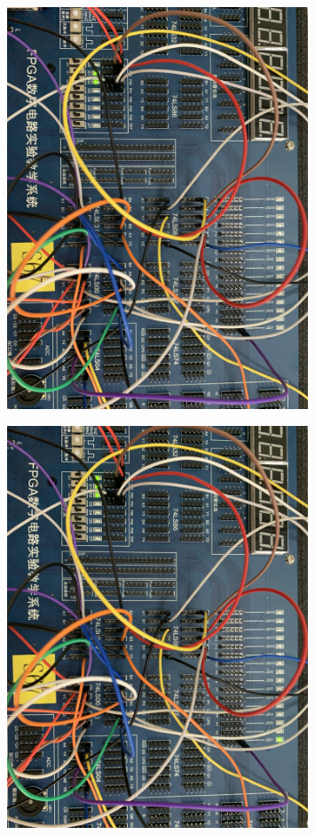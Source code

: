\documentclass[UTF8, a4paper, 11pt]{article}
\begin{document}
\begin{figure}[H]
    \centering
    \includegraphics[width=0.8\textwidth]{0110.JPG}
\end{figure}
\begin{figure}[H]
    \centering
    \includegraphics[width=0.8\textwidth]{0111.JPG}
\end{figure}
\end{document}
